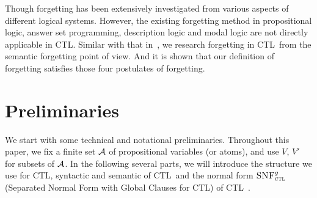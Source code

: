 \documentclass[runningheads]{llncs}
\newcommand{\Ha} {{\cal A}}
\newcommand{\CTL}{\textrm{CTL}}
\newcommand{\CTLsnf}{{\textsc{SNF}_{\textsc{ctl}}^g}}
\begin{document}
Though forgetting has been extensively investigated from various aspects of different logical systems.
However, the existing forgetting method in propositional
logic, answer set programming, description logic and modal logic are not directly applicable in \CTL.
Similar with that in~\cite{Yan:AIJ:2009}, we research forgetting in \CTL\ from the semantic forgetting point of view.
And it is shown that our definition of forgetting satisfies those four postulates of forgetting.
%
%
\section{Preliminaries}
We start with some technical and notational preliminaries. Throughout this paper, we fix a finite set $\Ha$ of propositional variables (or atoms), and use $V$, $V'$ for subsets of $\Ha$. In the following several parts, we will introduce the structure we use for \CTL, syntactic and semantic of \CTL\ and the normal form $\CTLsnf$ (Separated Normal Form with Global Clauses for \CTL) of \CTL~\cite{zhang2009refined}.
\end{document}
